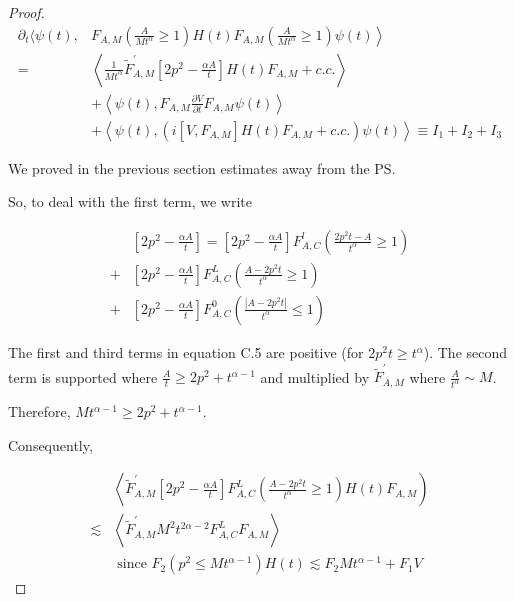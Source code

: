 \documentclass[10pt,a4paper]{amsart}
\begin{document}
\begin{proof}

\begin{align*}
\partial_{t}\langle\psi(t), & \left.F_{A, M}\left(\frac{A}{M t^{\alpha}} \geq 1\right) H(t) F_{A, M}\left(\frac{A}{M t^{\alpha}} \geq 1\right) \psi(t)\right\rangle \\
= & \left\langle\frac{1}{M t^{\alpha}} \tilde{F}_{A, M}^{\prime}\left[2 p^{2}-\frac{\alpha A}{t}\right] H(t) F_{A, M}+c . c .\right\rangle \\
& +\left\langle\psi(t), F_{A, M} \frac{\partial V}{\partial t} F_{A, M} \psi(t)\right\rangle  \tag{C.4}\\
& +\left\langle\psi(t),\left(i\left[V, F_{A, M}\right] H(t) F_{A, M}+c . c .\right) \psi(t)\right\rangle \equiv I_{1}+I_{2}+I_{3}
\end{align*}


We proved in the previous section estimates away from the PS.

So, to deal with the first term, we write

\begin{align*}
& {\left[2 p^{2}-\frac{\alpha A}{t}\right]=\left[2 p^{2}-\frac{\alpha A}{t}\right] F_{A, C}^l\left(\frac{2 p^{2} t-A}{t^{\alpha}} \geqslant 1\right) } \\
+ & {\left[2 p^{2}-\frac{\alpha A}{t}\right] F_{A, C}^L\left(\frac{A-2 p^{2} t}{t^{\alpha}} \geqslant 1\right) } \\
+ & {\left[2 p^{2}-\frac{\alpha A}{t}\right] F_{A, C}^0\left(\frac{\left|A-2 p^{2} t\right|}{t^{\alpha}} \leq 1\right) } \tag{C.5}
\end{align*}


The first and third terms in equation  C.5 are positive (for $2p^2 t\geq t^{\alpha}$).
The second term is supported where $\frac{A}{t} \geqslant 2 p^{2}+t^{\alpha-1}$ and multiplied by $\tilde{F}_{A, M}^{'}$ where $\frac{A}{t^{\alpha}} \sim M$.

Therefore, $M t^{\alpha-1} \geqslant 2 p^{2}+t^{\alpha-1}$.

Consequently,

\begin{align*}
& \left\langle\tilde{F}_{A, M}^{\prime}\left[2 p^{2}-\frac{\alpha A}{t}\right] F_{A, C}^L\left(\frac{A-2 p^{2} t}{t^{\alpha}} \geqslant 1\right) H(t) F_{A, M}\right) \\
\lesssim & \left\langle\tilde{F}_{A, M}^{\prime} M^{2} t^{2 \alpha-2} F_{A, C}^L F_{A, M}\right\rangle  \tag{C.6}\\
& \text { since } F_{2}\left(p^{2} \leq M t^{\alpha-1}\right) H(t) \lesssim F_{2} M t^{\alpha-1}+F_{1} V
\end{align*}


\end{proof}
\end{document}
